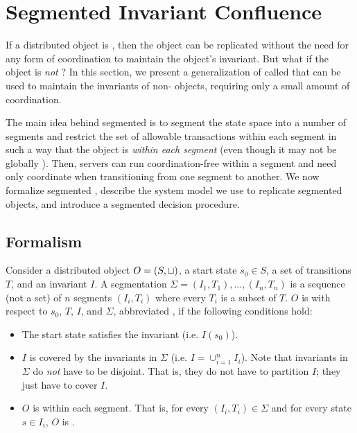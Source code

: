\section{Segmented Invariant Confluence}
\newcommand{\IsIclosed}{\textsf{IsIclosed}}

If a distributed object is \invariantconfluent{}, then the object can be
replicated without the need for any form of coordination to maintain the
object's invariant. But what if the object is \emph{not} \invariantconfluent{}?
In this section, we present a generalization of \invariantconfluence{} called
 that can be used to maintain the
invariants of non-\invariantconfluent{} objects, requiring only a small amount
of coordination.

The main idea behind segmented \invariantconfluence{} is to segment the state
space into a number of segments and restrict the set of allowable transactions
within each segment in such a way that the object is \invariantconfluent{}
\emph{within each segment} (even though it may not be globally
\invariantconfluent{}). Then, servers can run coordination-free within a
segment and need only coordinate when transitioning from one segment to
another. We now formalize segmented \invariantconfluence{}, describe the system
model we use to replicate segmented \invariantconfluent{} objects, and
introduce a segmented \invariantconfluence{} decision procedure.

\subsection{Formalism}
Consider a distributed object $O = (S, \sqcup)$, a start state $s_0 \in S$, a
set of transitions $T$, and an invariant $I$. A segmentation $\Sigma = (I_1,
T_1), \ldots, (I_n, T_n)$ is a sequence (not a set) of $n$ segments $(I_i,
T_i)$ where every $T_i$ is a subset of $T$. $O$ is  with respect to $s_0$, $T$, $I$, and $\Sigma$,
abbreviated , if the following conditions hold:
\begin{itemize}
  \item
    The start state satisfies the invariant (i.e. $I(s_0)$).

  \item
    $I$ is covered by the invariants in $\Sigma$ (i.e. $I = \cup_{i=1}^n I_i$).
    Note that invariants in $\Sigma$ do \emph{not} have to be disjoint. That
    is, they do not have to partition $I$; they just have to cover $I$.

  \item
    $O$ is \invariantconfluent{} within each segment. That is, for every $(I_i,
    T_i) \in \Sigma$ and for every state $s \in I_i$, $O$ is
    .
\end{itemize}

